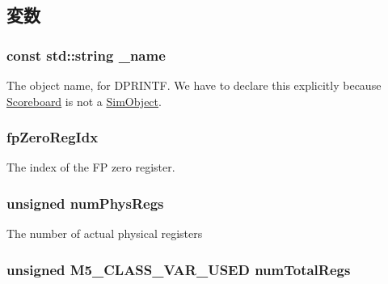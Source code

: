 \subsection{変数}
\hypertarget{classScoreboard_a1b003dc5cfce1a4d8f9a0c4b9b589045}{
\subsubsection[{\_\-name}]{\setlength{\rightskip}{0pt plus 5cm}const std::string {\bf \_\-name}}}
\label{classScoreboard_a1b003dc5cfce1a4d8f9a0c4b9b589045}
The object name, for DPRINTF. We have to declare this explicitly because \hyperlink{classScoreboard}{Scoreboard} is not a \hyperlink{classSimObject}{SimObject}. \hypertarget{classScoreboard_a55df2fe2fae9704590b9b50a53d48981}{
\subsubsection[{fpZeroRegIdx}]{ {\bf fpZeroRegIdx}}}
\label{classScoreboard_a55df2fe2fae9704590b9b50a53d48981}
The index of the FP zero register. \hypertarget{classScoreboard_a0d2a78a8e887f06150904000b2beb6cd}{
\subsubsection[{numPhysRegs}]{\setlength{\rightskip}{0pt plus 5cm}unsigned {\bf numPhysRegs}}}
\label{classScoreboard_a0d2a78a8e887f06150904000b2beb6cd}
The number of actual physical registers \hypertarget{classScoreboard_afa56b73206d6c8a0f68cc31143205f9e}{
\subsubsection[{numTotalRegs}]{\setlength{\rightskip}{0pt plus 5cm}unsigned M5\_\-CLASS\_\-VAR\_\-USED {\bf numTotalRegs}}}
